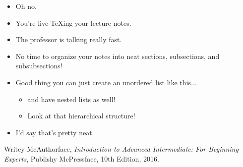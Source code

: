 \documentclass[twoside, titlepage]{amsart}
\theoremstyle{plain} %
\theoremstyle{definition}
\theoremstyle{remark}
\theoremstyle{notation}
\begin{document}
	\begin{itemize}
		\item Oh no.
		\item You're live-TeXing your lecture notes.
		\item The professor is talking really fast.
		\item No time to organize your notes into neat sections, subsections, and subsubsections!
		\item Good thing you can just create an unordered list like this...
		\begin{itemize}
			\item and have nested lists as well!
			\item Look at that hierarchical structure!
		\end{itemize}
		\item I'd say that's pretty neat.
	\end{itemize}
	
	\clearpage
	
	\begin{thebibliography}{"McAuthorface16"}
		Writey McAuthorface,
		\emph{Introduction to Advanced Intermediate: For Beginning Experts},
		Publishy McPressface,
		10th Edition,
		2016.
	\end{thebibliography}
\end{document}
